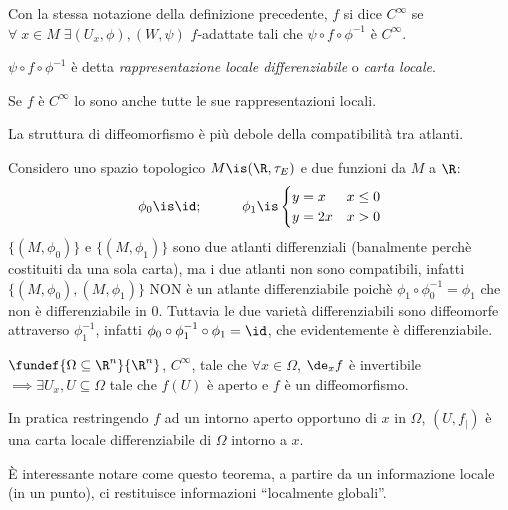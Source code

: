 \begin{defn}[$C^\infty$]
Con la stessa notazione della definizione precedente, $f$ si dice \emph{$C^\infty$} se
$\forall \; x \in M \;  \exists (U_x,\phi), (W,\psi)$ $f$-adattate tali che $\psi \circ f \circ \phi^{-1}$ è $C^\infty$.

$\psi \circ f \circ \phi^{-1}$ è detta \emph{rappresentazione locale differenziabile} o \emph{carta locale}.
\end{defn}

\begin{prop}
Se $f$ è $C^\infty$ lo sono anche tutte le sue rappresentazioni locali.
\end{prop}

\begin{oss}
La struttura di diffeomorfismo è più debole della compatibilità tra atlanti.
\end{oss}

\begin{es}
Considero uno spazio topologico $M \is (\R,\tau_E)$ e due funzioni da $M$ a $\R$:
\begin{equation*}
\phi_0\is \id ;\hspace{1cm} \phi_1\is\begin{cases}y=x & x\le 0 \\ y=2x & x>0 \end{cases}
\end{equation*}
$\{(M,\phi_0)\}$ e $\{(M,\phi_1)\}$ sono due atlanti differenziali (banalmente perchè costituiti da una sola carta), ma i due atlanti non sono compatibili, infatti $\{(M,\phi_0),(M,\phi_1)\}$ NON è un atlante differenziabile poichè $\phi_1 \circ \phi_0^{-1} = \phi_1$ che non è differenziabile in 0.
Tuttavia le due varietà differenziabili sono diffeomorfe attraverso $\phi_1^{-1}$, infatti $\phi_0 \circ \phi_1^{-1} \circ \phi_1 = \id$, che evidentemente è differenziabile.
\end{es}

\begin{oss}
\end{oss}

\begin{teo}
$\fundef{\Omega \subseteq \R^n}{\R^n}$, $C^\infty$, tale che $\forall x \in \Omega$, $\de_xf$ è invertibile $\implies \exists U_x, U\subseteq \Omega$ tale che $f(U)$ è aperto e $f$ è un diffeomorfismo.
\end{teo}

\begin{oss}
In pratica restringendo $f$ ad un intorno aperto opportuno di $x$ in $\Omega$, $(U,f_|)$ è una carta locale differenziabile di $\Omega$ intorno a $x$.

È interessante notare come questo teorema, a partire da un informazione locale (in un punto), ci restituisce informazioni ``localmente globali''.
\end{oss}

